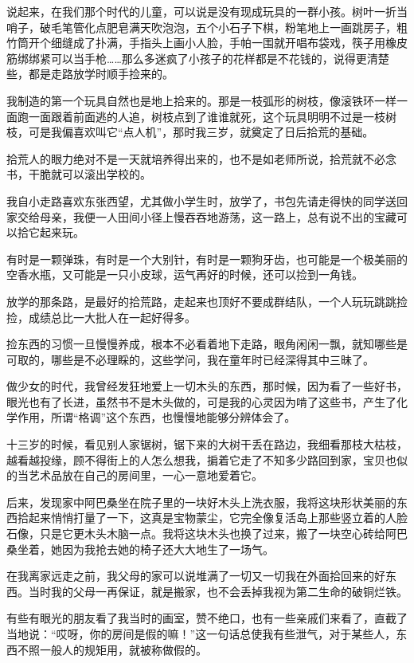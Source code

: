 \par 说起来，在我们那个时代的儿童，可以说是没有现成玩具的一群小孩。树叶一折当哨子，破毛笔管化点肥皂满天吹泡泡，五个小石子下棋，粉笔地上一画跳房子，粗竹筒开个细缝成了扑满，手指头上画小人脸，手帕一围就开唱布袋戏，筷子用橡皮筋绑绑紧可以当手枪……那么多迷疯了小孩子的花样都是不花钱的，说得更清楚些，都是走路放学时顺手捡来的。
\par 我制造的第一个玩具自然也是地上拾来的。那是一枝弧形的树枝，像滚铁环一样一面跑一面跟着前面逃的人追，树枝点到了谁谁就死，这个玩具明明不过是一枝树枝，可是我偏喜欢叫它“点人机”，那时我三岁，就奠定了日后拾荒的基础。
\par 拾荒人的眼力绝对不是一天就培养得出来的，也不是如老师所说，拾荒就不必念书，干脆就可以滚出学校的。
\par 我自小走路喜欢东张西望，尤其做小学生时，放学了，书包先请走得快的同学送回家交给母亲，我便一人田间小径上慢吞吞地游荡，这一路上，总有说不出的宝藏可以拾它起来玩。
\par 有时是一颗弹珠，有时是一个大别针，有时是一颗狗牙齿，也可能是一个极美丽的空香水瓶，又可能是一只小皮球，运气再好的时候，还可以捡到一角钱。
\par 放学的那条路，是最好的拾荒路，走起来也顶好不要成群结队，一个人玩玩跳跳捡捡，成绩总比一大批人在一起好得多。
\par 捡东西的习惯一旦慢慢养成，根本不必看着地下走路，眼角闲闲一飘，就知哪些是可取的，哪些是不必理睬的，这些学问，我在童年时已经深得其中三昧了。
\par 做少女的时代，我曾经发狂地爱上一切木头的东西，那时候，因为看了一些好书，眼光也有了长进，虽然书不是木头做的，可是我的心灵因为啃了这些书，产生了化学作用，所谓“格调”这个东西，也慢慢地能够分辨体会了。
\par 十三岁的时候，看见别人家锯树，锯下来的大树干丢在路边，我细看那枝大枯枝，越看越投缘，顾不得街上的人怎么想我，掮着它走了不知多少路回到家，宝贝也似的当艺术品放在自己的房间里，一心一意地爱着它。
\par 后来，发现家中阿巴桑坐在院子里的一块好木头上洗衣服，我将这块形状美丽的东西拾起来悄悄打量了一下，这真是宝物蒙尘，它完全像复活岛上那些竖立着的人脸石像，只是它更木头木脑一点。我将这块木头也换了过来，搬了一块空心砖给阿巴桑坐着，她因为我抢去她的椅子还大大地生了一场气。
\par 在我离家远走之前，我父母的家可以说堆满了一切又一切我在外面拾回来的好东西。当时我的父母一再保证，就是搬家，也不会丢掉我视为第二生命的破铜烂铁。
\par 有些有眼光的朋友看了我当时的画室，赞不绝口，也有一些亲戚们来看了，直截了当地说：“哎呀，你的房间是假的嘛！”这一句话总使我有些泄气，对于某些人，东西不照一般人的规矩用，就被称做假的。
